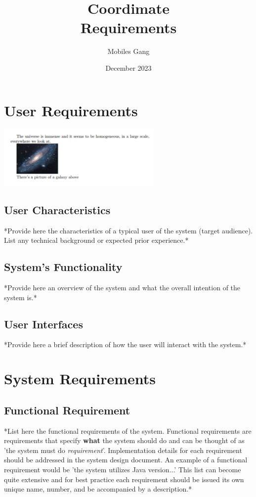 \documentclass{article}
\title{Coordimate\\ Requirements}
\date{December 2023}
\author{Mobiles Gang}
\begin{document}
\maketitle

\section{User Requirements}

\begin{center}
\includegraphics[width=8cm]{universe}
\end{center}

\subsection{User Characteristics}

*Provide here the characteristics of a typical user of the system (target
audience). List any technical background or expected prior experience.*  

\subsection{System's Functionality}

*Provide here an overview of the system and what the overall intention of the
system is.* 
      
\subsection{User Interfaces }

*Provide here a brief description of how the user will interact with the
system.*


\section{System Requirements}

\subsection{Functional Requirement}

*List here the functional requirements of the system. Functional requirements
are requirements that specify \textbf{what} the system should do and can be
thought of as 'the system must do \textit{requirement}'. Implementation details
for each requirement should be addressed in the system design document. An
example of a functional requirement would be 'the system utilizes Java
version...' This list can become quite extensive and for best practice each
requirement should be issued its own unique name, number, and be accompanied by
a description.*
\end{document}

